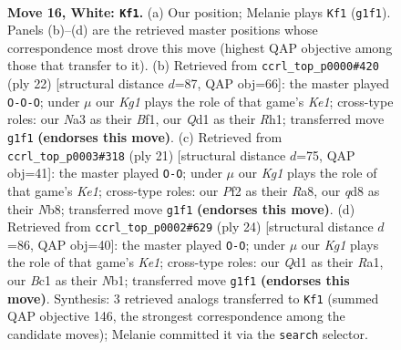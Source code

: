 \documentclass[11pt]{article}
\begin{document}
\begin{figure}[p]
\label{fig:thought-m28}
\end{figure}

\clearpage

\begin{figure}[p]\centering
\begin{subfigure}{0.46\textwidth}\centering
\resizebox{\linewidth}{!}{%
\newchessgame
\chessboard[
  setfen={r1bqr1k1/1pp2p1p/2n2b2/p2p4/3P4/N3P1P1/PP3P2/RNBQR1K1 w - - 2 16},
  showmover=false,
  pgfstyle=straightmove, color=movearrow, markmove={g1-f1}
]}
\caption{}
\end{subfigure}\hfill
\begin{subfigure}{0.46\textwidth}\centering
\resizebox{\linewidth}{!}{%
\newchessgame
\chessboard[
  setfen={r2q1rk1/ppp2pp1/2n2b1p/3p4/3P4/2N1PP1P/PPQ2P2/R3KB1R w KQ - 1 12},
  showmover=false,
  pgfstyle=straightmove, color=movearrow, markmove={e1-c1}
]}
\caption{}
\end{subfigure}
\\[4pt]
\begin{subfigure}{0.46\textwidth}\centering
\resizebox{\linewidth}{!}{%
\newchessgame
\chessboard[
  setfen={rn1qk2r/pp3ppp/2p1bn2/2P5/3P4/P7/2B2PPP/R1BQK1NR b KQkq - 0 11},
  showmover=false,
  pgfstyle=straightmove, color=movearrow, markmove={e8-g8}
]}
\caption{}
\end{subfigure}\hfill
\begin{subfigure}{0.46\textwidth}\centering
\resizebox{\linewidth}{!}{%
\newchessgame
\chessboard[
  setfen={1r1qkb1r/pbpn1ppp/4p3/Q1P5/8/5NP1/PP2PPBP/RN2K2R w KQk - 1 13},
  showmover=false,
  pgfstyle=straightmove, color=movearrow, markmove={e1-g1}
]}
\caption{}
\end{subfigure}
\caption{\textbf{Move 16, White: \texttt{Kf1}.} (a) Our position; Melanie plays \texttt{Kf1} (\texttt{g1f1}). Panels (b)--(d) are the retrieved master positions whose correspondence most drove this move (highest QAP objective among those that transfer to it). (b) Retrieved from \texttt{ccrl\_top\_p0000\#420} (ply 22) [structural distance $d$=87, QAP obj=66]: the master played \texttt{O-O-O}; under $\mu$ our \emph{Kg1} plays the role of that game's \emph{Ke1}; cross-type roles: our \emph{N}a3 as their \emph{B}f1, our \emph{Q}d1 as their \emph{R}h1; transferred move \texttt{g1f1} \textbf{(endorses this move)}. (c) Retrieved from \texttt{ccrl\_top\_p0003\#318} (ply 21) [structural distance $d$=75, QAP obj=41]: the master played \texttt{O-O}; under $\mu$ our \emph{Kg1} plays the role of that game's \emph{Ke1}; cross-type roles: our \emph{P}f2 as their \emph{R}a8, our \emph{q}d8 as their \emph{N}b8; transferred move \texttt{g1f1} \textbf{(endorses this move)}. (d) Retrieved from \texttt{ccrl\_top\_p0002\#629} (ply 24) [structural distance $d$=86, QAP obj=40]: the master played \texttt{O-O}; under $\mu$ our \emph{Kg1} plays the role of that game's \emph{Ke1}; cross-type roles: our \emph{Q}d1 as their \emph{R}a1, our \emph{B}c1 as their \emph{N}b1; transferred move \texttt{g1f1} \textbf{(endorses this move)}. Synthesis: 3 retrieved analogs transferred to \texttt{Kf1} (summed QAP objective 146, the strongest correspondence among the candidate moves); Melanie committed it via the \texttt{search} selector.}

\end{figure}
\end{document}
